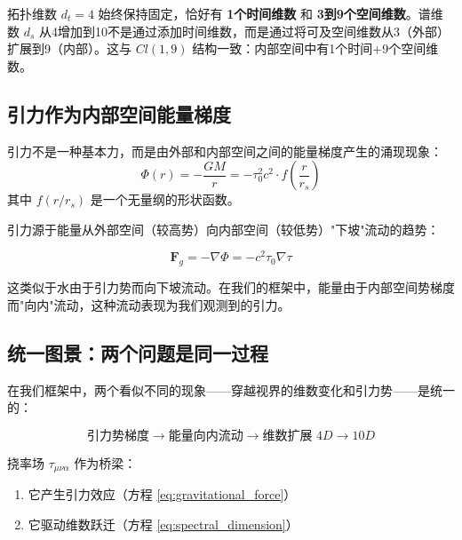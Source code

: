 \begin{remark}[固定时间维数]
拓扑维数 $d_t = 4$ 始终保持固定，恰好有 \textbf{1个时间维数} 和 \textbf{3到9个空间维数}。谱维数 $d_s$ 从4增加到10不是通过添加时间维数，而是通过将可及空间维数从3（外部）扩展到9（内部）。这与 $Cl(1,9)$ 结构一致：内部空间中有1个时间+9个空间维数。
\end{remark}

\subsection{引力作为内部空间能量梯度}

\begin{hypothesis}[引力作为内部空间势]
引力不是一种基本力，而是由外部和内部空间之间的能量梯度产生的涌现现象：
\begin{equation}
    \Phi(r) = -\frac{GM}{r} = -\tau_0^2 c^2 \cdot f\left(\frac{r}{r_s}\right)
    \label{eq:gravity_as_potential}
\end{equation}
其中 $f(r/r_s)$ 是一个无量纲的形状函数。
\end{hypothesis}

引力源于能量从外部空间（较高势）向内部空间（较低势）"下坡"流动的趋势：

\begin{equation}
    \mathbf{F}_g = -\nabla\Phi = -c^2 \tau_0 \nabla\tau
    \label{eq:gravitational_force}
\end{equation}

\begin{remark}[物理类比]
这类似于水由于引力势而向下坡流动。在我们的框架中，能量由于内部空间势梯度而"向内"流动，这种流动表现为我们观测到的引力。
\end{remark}

\subsection{统一图景：两个问题是同一过程}

在我们框架中，两个看似不同的现象——穿越视界的维数变化和引力势——是统一的：

\begin{equation}
    \text{引力势梯度} \to \text{能量向内流动} \to \text{维数扩展 } 4D \to 10D
    \label{eq:unified_process}
\end{equation}

挠率场 $\tau_{\mu\nu\alpha}$ 作为桥梁：
\begin{enumerate}
    \item 它产生引力效应（方程 \eqref{eq:gravitational_force}）
    \item 它驱动维数跃迁（方程 \eqref{eq:spectral_dimension}）
\end{enumerate}

